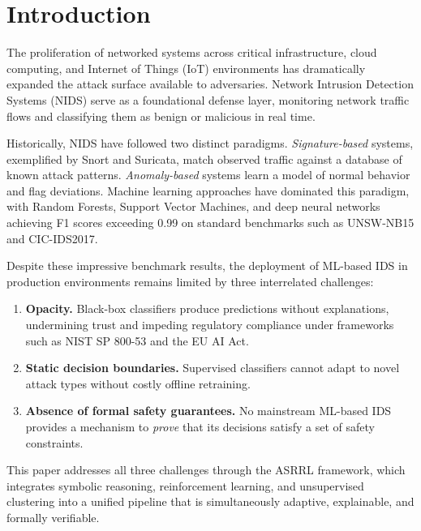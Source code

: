 \documentclass[conference]{IEEEtran}
\newcommand{\ASRRL}{\textsc{ASRRL}}
\begin{document}
\section{Introduction}
\label{sec:introduction}

The proliferation of networked systems across critical infrastructure, cloud computing, and Internet of Things (IoT) environments has dramatically expanded the attack surface available to adversaries. Network Intrusion Detection Systems (NIDS) serve as a foundational defense layer, monitoring network traffic flows and classifying them as benign or malicious in real time.

Historically, NIDS have followed two distinct paradigms. \emph{Signature-based} systems, exemplified by Snort and Suricata, match observed traffic against a database of known attack patterns. \emph{Anomaly-based} systems learn a model of normal behavior and flag deviations. Machine learning approaches have dominated this paradigm, with Random Forests, Support Vector Machines, and deep neural networks achieving F1 scores exceeding 0.99 on standard benchmarks such as UNSW-NB15 and CIC-IDS2017.

Despite these impressive benchmark results, the deployment of ML-based IDS in production environments remains limited by three interrelated challenges:

\begin{enumerate}
    \item \textbf{Opacity.} Black-box classifiers produce predictions without explanations, undermining trust and impeding regulatory compliance under frameworks such as NIST SP 800-53 and the EU AI Act.

    \item \textbf{Static decision boundaries.} Supervised classifiers cannot adapt to novel attack types without costly offline retraining.

    \item \textbf{Absence of formal safety guarantees.} No mainstream ML-based IDS provides a mechanism to \emph{prove} that its decisions satisfy a set of safety constraints.
\end{enumerate}

This paper addresses all three challenges through the \ASRRL{} framework, which integrates symbolic reasoning, reinforcement learning, and unsupervised clustering into a unified pipeline that is simultaneously adaptive, explainable, and formally verifiable.
\end{document}
